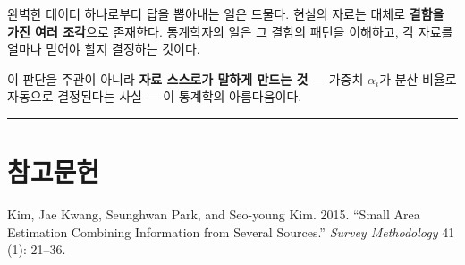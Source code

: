 \documentclass[
  letterpaper,
  DIV=11,
  numbers=noendperiod]{scrreprt}
\newlength{\cslhangindent}
\newenvironment{CSLReferences}[2] %
 {\begin{list}{}{%
  \setlength{\itemindent}{0pt}
  \setlength{\leftmargin}{0pt}
  \setlength{\parsep}{0pt}
  \ifodd #1
   \setlength{\leftmargin}{\cslhangindent}
   \setlength{\itemindent}{-1\cslhangindent}
  \fi
  \setlength{\itemsep}{#2\baselineskip}}}
 {\end{list}}
\begin{document}
\begin{tcolorbox}[enhanced jigsaw, arc=.35mm, bottomrule=.15mm, bottomtitle=1mm, breakable, colback=white, colbacktitle=quarto-callout-tip-color!10!white, colframe=quarto-callout-tip-color-frame, coltitle=black, left=2mm, leftrule=.75mm, opacityback=0, opacitybacktitle=0.6, rightrule=.15mm, title=\textcolor{quarto-callout-tip-color}{\faLightbulb}\hspace{0.5em}{통계학자의 관점}, titlerule=0mm, toprule=.15mm, toptitle=1mm]

완벽한 데이터 하나로부터 답을 뽑아내는 일은 드물다. 현실의 자료는 대체로
\textbf{결함을 가진 여러 조각}으로 존재한다. 통계학자의 일은 그 결함의
패턴을 이해하고, 각 자료를 얼마나 믿어야 할지 결정하는 것이다.

이 판단을 주관이 아니라 \textbf{자료 스스로가 말하게 만드는 것} ---
가중치 \(\alpha_i\)가 분산 비율로 자동으로 결정된다는 사실 --- 이
통계학의 아름다움이다.

\end{tcolorbox}

\begin{center}\rule{0.5\linewidth}{0.5pt}\end{center}

\section{참고문헌}\label{uxcc38uxace0uxbb38uxd5cc-2}

\protect{}\label{refs}
\begin{CSLReferences}{1}{1}
Kim, Jae Kwang, Seunghwan Park, and Seo-young Kim. 2015. {``Small Area
Estimation Combining Information from Several Sources.''} \emph{Survey
Methodology} 41 (1): 21--36.

\end{CSLReferences}
\end{document}
